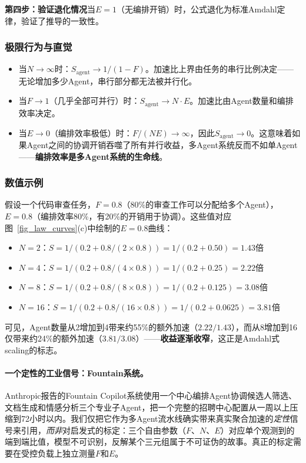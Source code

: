 \textbf{第四步：验证退化情况}当$E = 1$（无编排开销）时，公式退化为标准Amdahl定律，验证了推导的一致性。

\subsubsection{极限行为与直觉}

\begin{itemize}[nosep]
\item 当$N \to \infty$时：$S_{\mathrm{agent}} \to 1/(1-F)$。加速比上界由任务的串行比例决定——无论增加多少Agent，串行部分都无法被并行化。
\item 当$F \to 1$（几乎全部可并行）时：$S_{\mathrm{agent}} \to N \cdot E$。加速比由Agent数量和编排效率决定。
\item 当$E \to 0$（编排效率极低）时：$F/(NE) \to \infty$，因此$S_{\mathrm{agent}} \to 0$。这意味着如果Agent之间的协调开销吞噬了所有并行收益，多Agent系统反而不如单Agent——\textbf{编排效率是多Agent系统的生命线}。
\end{itemize}

\subsubsection{数值示例}

假设一个代码审查任务，$F = 0.8$（80\%的审查工作可以分配给多个Agent），$E = 0.8$（编排效率80\%，有20\%的开销用于协调）。这些值对应图~\ref{fig_law_curves}(c)中绘制的$E=0.8$曲线：

\begin{itemize}[nosep]
\item $N = 2$：$S = 1/(0.2 + 0.8/(2 \times 0.8)) = 1/(0.2 + 0.50) = 1.43$倍
\item $N = 4$：$S = 1/(0.2 + 0.8/(4 \times 0.8)) = 1/(0.2 + 0.25) = 2.22$倍
\item $N = 8$：$S = 1/(0.2 + 0.8/(8 \times 0.8)) = 1/(0.2 + 0.125) = 3.08$倍
\item $N = 16$：$S = 1/(0.2 + 0.8/(16 \times 0.8)) = 1/(0.2 + 0.0625) = 3.81$倍
\end{itemize}

可见，Agent数量从2增加到4带来约55\%的额外加速（$2.22/1.43$），而从8增加到16仅带来约24\%的额外加速（$3.81/3.08$）——\textbf{收益逐渐收窄}，这正是Amdahl式scaling的标志。

\paragraph{一个定性的工业信号：Fountain系统。}
Anthropic报告的Fountain Copilot系统使用一个中心编排Agent协调候选人筛选、文档生成和情感分析三个专业子Agent，把一个完整的招聘中心配置从一周以上压缩到72小时以内\cite{anthropic2026agenticreport}。我们仅把它作为多Agent流水线确实带来真实聚合加速的\emph{定性}信号来引用，\emph{而非}对启发式的标定：三个自由参数（$F$、$N$、$E$）对应单个观测到的端到端比值，模型不可识别，反解某个三元组属于不可证伪的故事。真正的标定需要在受控负载上独立测量$F$和$E$。

